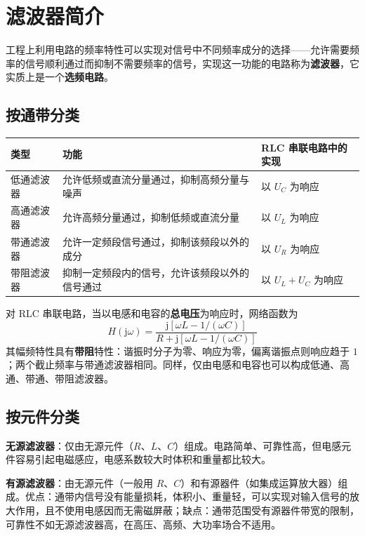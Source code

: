 
\section{滤波器简介}
工程上利用电路的频率特性可以实现对信号中不同频率成分的选择——允许需要频率的信号顺利通过而抑制不需要频率的信号，实现这一功能的电路称为\textbf{滤波器}，它实质上是一个\textbf{选频电路}。

\subsection{按通带分类}
\begin{center}
\begin{tabular}{@{}lll@{}}
\toprule
类型 & 功能 & RLC 串联电路中的实现 \\
\midrule
低通滤波器 & 允许低频或直流分量通过，抑制高频分量与噪声 & 以 $U_C$ 为响应 \\
高通滤波器 & 允许高频分量通过，抑制低频或直流分量 & 以 $U_L$ 为响应 \\
带通滤波器 & 允许一定频段信号通过，抑制该频段以外的成分 & 以 $U_R$ 为响应 \\
带阻滤波器 & 抑制一定频段内的信号，允许该频段以外的信号通过 & 以 $U_L+U_C$ 为响应 \\
\bottomrule
\end{tabular}
\end{center}

对 RLC 串联电路，当以电感和电容的\textbf{总电压}为响应时，网络函数为
\begin{equation}
H(\mathrm{j}\omega)=\frac{\mathrm{j}\left[\omega L-1/(\omega C)\right]}{R+\mathrm{j}\left[\omega L-1/(\omega C)\right]}
\end{equation}
其幅频特性具有\textbf{带阻}特性：谐振时分子为零、响应为零，偏离谐振点则响应趋于 $1$；两个截止频率与带通滤波器相同。同样，仅由电感和电容也可以构成低通、高通、带通、带阻滤波器。

\subsection{按元件分类}
\textbf{无源滤波器}：仅由无源元件（$R$、$L$、$C$）组成。电路简单、可靠性高，但电感元件容易引起电磁感应，电感系数较大时体积和重量都比较大。

\textbf{有源滤波器}：由无源元件（一般用 $R$、$C$）和有源器件（如集成运算放大器）组成。优点：通带内信号没有能量损耗，体积小、重量轻，可以实现对输入信号的放大作用，且不使用电感因而无需磁屏蔽；缺点：通带范围受有源器件带宽的限制，可靠性不如无源滤波器高，在高压、高频、大功率场合不适用。

